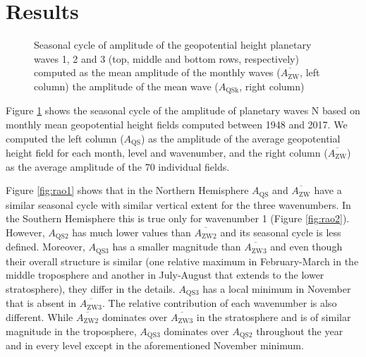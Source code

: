 \documentclass[draft,linenumbers]{agujournal2018}
\begin{document}
\section{Results}

\begin{figure}[h]

{\centering {}\newline{}

}

\caption{Seasonal cycle of amplitude of the geopotential height planetary waves 1, 2 and 3 (top, middle and bottom rows, respectively) computed as the mean amplitude of the monthly waves ($\overline{A_\mathrm{ZW} }$, left column) the amplitude of the mean wave ($A_\mathrm{QSk}$, right column)}\label{fig:rao}
\end{figure}

Figure \ref{fig:rao} shows the seasonal cycle of the amplitude of
planetary waves N based on monthly mean geopotential height fields
computed between 1948 and 2017. We computed the left column
(\(A_\mathrm{QS}\)) as the amplitude of the average geopotential height
field for each month, level and wavenumber, and the right column
(\(\overline{A_\mathrm{ZW}}\)) as the average amplitude of the 70
individual fields.

Figure \ref{fig:rao1} shows that in the Northern Hemisphere
\(A_\mathrm{QS}\) and \(\overline{A_\mathrm{ZW}}\) have a similar
seasonal cycle with similar vertical extent for the three wavenumbers.
In the Southern Hemisphere this is true only for wavenumber 1 (Figure
\ref{fig:rao2}). However, \(A_\mathrm{QS2}\) has much lower values than
\(\overline{A_\mathrm{ZW2}}\) and its seasonal cycle is less defined.
Moreover, \(A_\mathrm{QS3}\) has a smaller magnitude than
\(\overline{A_\mathrm{ZW3}}\) and even though their overall structure is
similar (one relative maximum in February-March in the middle
troposphere and another in July-August that extends to the lower
stratosphere), they differ in the details. \(A_\mathrm{QS3}\) has a
local minimum in November that is absent in
\(\overline{A_\mathrm{ZW3}}\). The relative contribution of each
wavenumber is also different. While \(\overline{A_\mathrm{ZW2}}\)
dominates over \(\overline{A_\mathrm{ZW3}}\) in the stratosphere and is
of similar magnitude in the troposphere, \(A_\mathrm{QS3}\) dominates
over \(A_\mathrm{QS2}\) throughout the year and in every level except in
the aforementioned November minimum.
\end{document}

